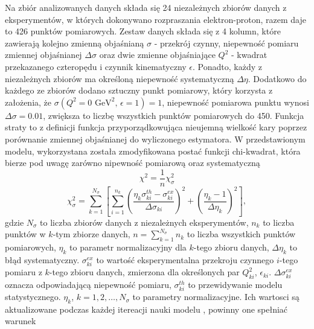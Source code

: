 \documentclass[11pt]{book}
\theoremstyle{definition}
\begin{document}
%
Na zbiór analizowanych danych składa się 24 niezależnych zbiorów danych z eksperymentów, w których dokonywano rozpraszania elektron-proton, razem daje to 426 punktów pomiarowych. Zestaw danych składa się z 4 kolumn, które zawierają kolejno zmienną objaśnianą $\sigma$ - przekrój czynny, niepewność pomiaru zmiennej objaśnianej $\Delta \sigma$ oraz dwie zmienne objaśniające $Q^2$ - kwadrat przekazanego czteropędu i czynnik kinematyczny $\epsilon$. Ponadto, każdy z niezależnych zbiorów ma określoną niepewność systematyczną $\Delta \eta$.  Dodatkowo do każdego ze zbiorów dodano sztuczny punkt pomiarowy, który korzysta z założenia, że $\sigma \left(Q^2 = 0 \text{ GeV}^2, \, \epsilon = 1 \right) = 1$, niepewność pomiarowa punktu wynosi $\Delta \sigma = 0.01$, zwiększa to liczbę wszystkich punktów pomiarowych do 450.
%
%
%
Funkcja straty to z definicji funkcja przyporządkowująca nieujemną wielkość kary poprzez porównanie zmiennej objaśnianej do wyliczonego estymatora. W przedstawionym modelu, wykorzystana została zmodyfikowana postać funkcji chi-kwadrat, która bierze pod uwagę zarówno nipewność pomiarową oraz systematyczną
%
\begin{equation}
\chi^2 = \frac{1}{n} \chi_{\sigma}^2
\end{equation}
%
\begin{equation}
\chi_{\sigma}^2 = \sum_{k=1}^{N_{\sigma}} \left[ \sum_{i=1}^{n_k} \left( \frac{\eta_k \sigma^{th}_{ki} - \sigma^{ex}_{ki}}{\Delta \sigma_{ki}} \right)^2 + \left(\frac{\eta_k - 1}{\Delta \eta_k}\right)^2 \right],
\end{equation}
%
gdzie $N_{\sigma}$ to liczba zbiorów danych z niezależnych eksperymentów, $n_k$ to liczba punktów w $k$-tym zbiorze danych, $n = \sum_{k=1}^{N_{\sigma}}n_k$ to liczba wszystkich punktów pomiarowych, $\eta_k$ to parametr normalizacyjny dla $k$-tego zbioru danych, $\Delta \eta_k$ to błąd systematyczny. $\sigma^{ex}_{ki}$ to wartość eksperymentalna przekroju czynnego $i$-tego pomiaru z $k$-tego zbioru danych, zmierzona dla określonych par $Q^2_{ki}$, $\epsilon_{ki}$. $\Delta \sigma_{ki}^{ex}$ oznacza odpowiadającą niepewność pomiaru, $\sigma_{ki}^{th}$ to przewidywanie modelu statystycznego. $\eta_k$, $k =1,2,\dots, N_{\sigma}$ to parametry normalizacyjne. Ich wartosci są aktualizowane podczas każdej itereacji nauki modelu \cite{PhysRevC.84.034314}, powinny one spełniać warunek
\end{document}
